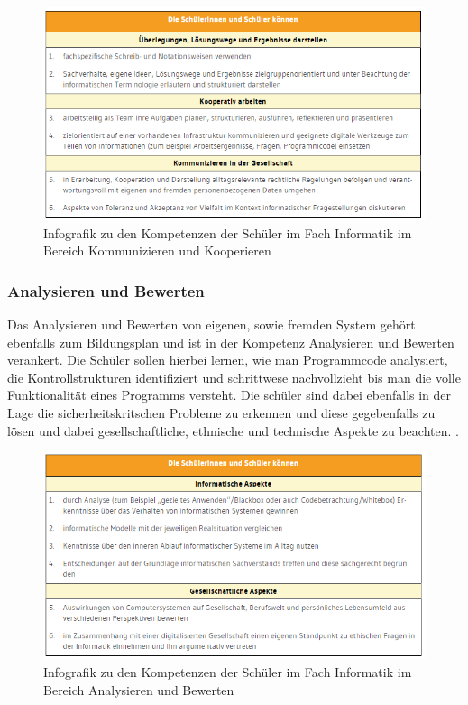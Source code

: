 \begin{figure}[H]
	\centering
	\includegraphics[width=\textwidth,height=\textheight,keepaspectratio]{images/team.png}
	\caption{Infografik zu den Kompetenzen der Schüler im Fach Informatik im Bereich Kommunizieren und Kooperieren}
	\label{Kommunizieren und Kooperieren Infografik}
\end{figure}

\subsubsection{Analysieren und Bewerten}

Das Analysieren und Bewerten von eigenen, sowie fremden System gehört ebenfalls zum Bildungsplan und ist in der Kompetenz Analysieren und Bewerten verankert. Die Schüler sollen hierbei lernen, wie man Programmcode analysiert, die Kontrollstrukturen identifiziert und schrittwese nachvollzieht bis man die volle Funktionalität eines Programms versteht. Die schüler sind dabei ebenfalls in der Lage die sicherheitskritschen Probleme zu erkennen und diese gegebenfalls zu lösen und dabei gesellschaftliche, ethnische und technische Aspekte zu beachten.
\cite{Analy}.

\begin{figure}[H]
	\centering
	\includegraphics[width=\textwidth,height=\textheight,keepaspectratio]{images/Analysieren.png}
	\caption{Infografik zu den Kompetenzen der Schüler im Fach Informatik im Bereich Analysieren und Bewerten}
	\label{Analysieren und Bewerten Infografik}
\end{figure}

